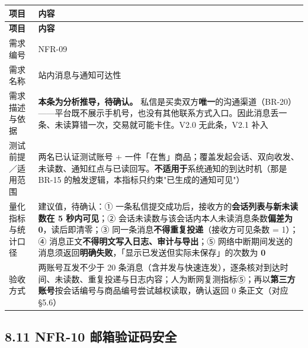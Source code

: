 \documentclass[12pt,a4paper]{ctexart}
\begin{document}
{\scriptsize
\begin{longtable}{|p{2.75cm}|p{13.25cm}|}
\hline
\textbf{项目} & \textbf{内容} \\
\hline
\endfirsthead
\hline
\textbf{项目} & \textbf{内容} \\
\hline
\endhead
\hline
\endfoot
需求编号 & NFR-09 \\
\hline
需求名称 & 站内消息与通知可达性 \\
\hline
需求描述与依据 & \textbf{本条为分析推导，待确认。} 私信是买卖双方\textbf{唯一}的沟通渠道（BR-20）——平台既不展示手机号，也没有其他联系方式入口。因此消息丢一条、未读算错一次，交易就可能卡住。V2.0 无此条，V2.1 补入 \\
\hline
测试前提／适用范围 & 两名已认证测试账号 + 一件「在售」商品；覆盖发起会话、双向收发、未读数、通知红点与已读回写。\textbf{不适用于}系统通知的到达时机（那是 BR-15 的触发逻辑，本指标只约束"已生成的通知可见"） \\
\hline
量化指标与统计口径 & 建议值，待确认：① 一条私信提交成功后，接收方的\textbf{会话列表与新未读数在 5 秒内可见}；② 会话未读数与该会话内本人未读消息条数\textbf{偏差为 0}，读后即清零；③ 同一条消息\textbf{不得重复投递}（接收方可见条数 = 1）；④ 消息正文\textbf{不得明文写入日志、审计与导出}；⑤ 网络中断期间发送的消息须返回\textbf{明确失败}，「显示已发送但实际未保存」的次数为 \textbf{0} \\
\hline
验收方式 & 两账号互发不少于 20 条消息（含并发与快速连发），逐条核对到达时间、未读数、重复投递与日志内容；人为断网复测指标⑤；再以\textbf{第三方账号}按会话编号与商品编号尝试越权读取，确认返回 0 条正文（对应 §5.6） \\
\hline
\end{longtable}
}


\subsection*{8.11 NFR-10 邮箱验证码安全}
\end{document}

